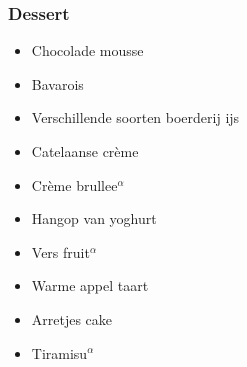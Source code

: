 \subsubsection*{Dessert}
\begin{itemize}
	\item	Chocolade mousse
	\item	Bavarois
	\item	Verschillende soorten boerderij ijs
	\item	Catelaanse crème
	\item	Crème brullee$^{\alpha}$
	\item	Hangop van yoghurt
	\item	Vers fruit$^{\alpha}$
	\item	Warme appel taart
	\item	Arretjes cake
	\item	Tiramisu$^{\alpha}$
\end{itemize}


